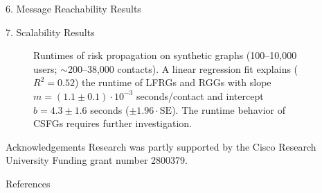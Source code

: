 \documentclass[final]{beamer}
\newlength{\sepwidth}
\newlength{\colwidth}
\newcommand{\separatorcolumn}{\begin{column}{\sepwidth}\end{column}}
\begin{document}
\begin{frame}[t]
\begin{columns}[t]
\begin{column}{\colwidth}
\begin{block}{6. Message Reachability Results}
\begin{table}
\begin{minipage}[b]{0.3\columnwidth}
			\end{minipage}
		\end{table}
	\end{block}
	\begin{block}{7. Scalability Results}
		\begin{figure}
			\centering
			\caption{Runtimes of risk propagation on synthetic graphs (100--10,000 users; $\sim$200--38,000 contacts). A linear regression fit explains ($R^2 = 0.52$) the runtime of LFRGs and RGGs with slope $m = (1.1 \pm 0.1) \cdot 10^{-3}$ seconds/contact and intercept $b = 4.3 \pm 1.6$ seconds ($\pm 1.96 \cdot \mathrm{SE}$). The runtime behavior of CSFGs requires further investigation.}
			\label{fig:scalability}
		\end{figure}
	\end{block}
	\begin{block}{Acknowledgements}
		Research was partly supported by the Cisco Research University Funding grant number 2800379.
	\end{block}
	\begin{block}{References}
		\nocite{*}
		\scriptsize{}
	\end{block}
\end{column}
\separatorcolumn
\end{columns}
\end{frame}
\end{document}
